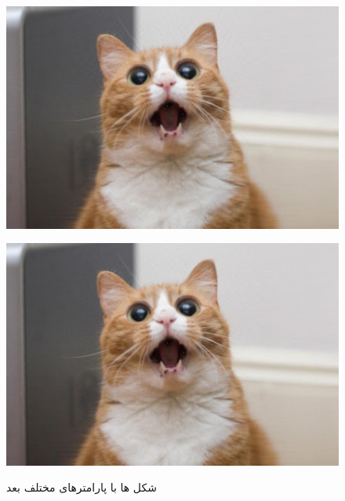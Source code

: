 \begin{sol}
\begin{figure}[h]
    \begin{minipage}[t]{.24\textwidth}
        \centering
        \includegraphics[width=1.1\textwidth]{61.jpg}
        \label{fig:p61}
    \end{minipage}
    \hfill
    \begin{minipage}[t]{.24\textwidth}
        \centering
        \includegraphics[width=1.1\textwidth]{71.jpg}
        \label{fig:p71}
    \end{minipage} 
    \caption{شکل ها با پارامترهای مختلف بعد} 
    \label{fig:4}
\end{figure}

\end{sol}